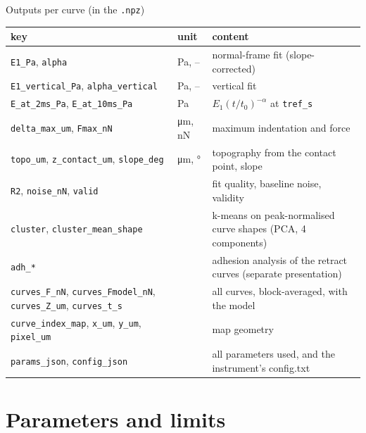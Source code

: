 \documentclass[aspectratio=169,9pt]{beamer}
\begin{document}
\begin{frame}{Outputs per curve (in the \texttt{.npz})}
\scriptsize
\begin{tabularx}{\textwidth}{@{}l l X@{}}
\toprule
key & unit & content\\
\midrule
\texttt{E1\_Pa}, \texttt{alpha} & Pa, -- & normal-frame fit (slope-corrected)\\
\texttt{E1\_vertical\_Pa}, \texttt{alpha\_vertical} & Pa, -- & vertical fit\\
\texttt{E\_at\_2ms\_Pa}, \texttt{E\_at\_10ms\_Pa} & Pa & $E_1(t/t_0)^{-\alpha}$ at \texttt{tref\_s}\\
\texttt{delta\_max\_um}, \texttt{Fmax\_nN} & \si{\micro\metre}, nN & maximum indentation and force\\
\texttt{topo\_um}, \texttt{z\_contact\_um}, \texttt{slope\_deg} & \si{\micro\metre}, ° & topography from the contact point, slope\\
\texttt{R2}, \texttt{noise\_nN}, \texttt{valid} & & fit quality, baseline noise, validity\\
\texttt{cluster}, \texttt{cluster\_mean\_shape} & & k-means on peak-normalised curve shapes (PCA, 4 components)\\
\texttt{adh\_*} & & adhesion analysis of the retract curves (separate presentation)\\
\texttt{curves\_F\_nN}, \texttt{curves\_Fmodel\_nN}, \texttt{curves\_Z\_um}, \texttt{curves\_t\_s} & & all curves, block-averaged, with the model\\
\texttt{curve\_index\_map}, \texttt{x\_um}, \texttt{y\_um}, \texttt{pixel\_um} & & map geometry\\
\texttt{params\_json}, \texttt{config\_json} & & all parameters used, and the instrument's config.txt\\
\bottomrule
\end{tabularx}
\end{frame}

\section{Parameters and limits}
\end{document}
